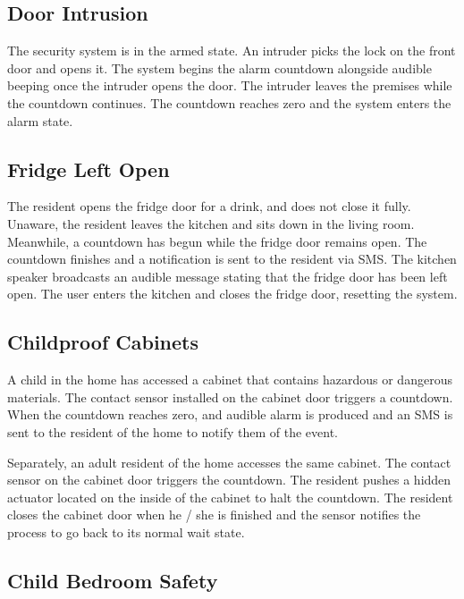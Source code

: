 \documentclass{report}
\begin{document}
\subsection*{Door Intrusion}

The security system is in the armed state. An intruder picks the lock on the
front door and opens it.  The system begins the alarm countdown alongside
audible beeping once the intruder opens the door.  The intruder leaves the
premises while the countdown continues. The countdown reaches zero and the
system enters the alarm state.

\subsection*{Fridge Left Open}

The resident opens the fridge door for a drink, and does not close it fully.
Unaware, the resident leaves the kitchen and sits down in the living room.
Meanwhile, a countdown has begun while the fridge door remains open. The
countdown finishes and a notification is sent to the resident via SMS. The
kitchen speaker broadcasts an audible message stating that the fridge door has
been left open. The user enters the kitchen and closes the fridge door,
resetting the system. 

\subsection*{Childproof Cabinets}

A child in the home has accessed a cabinet that contains hazardous or dangerous
materials. The contact sensor installed on the cabinet door triggers a
countdown. When the countdown reaches zero, and audible alarm is produced and
an SMS is sent to the resident of the home to notify them of the event.

Separately, an adult resident of the home accesses the same cabinet. The
contact sensor on the cabinet door triggers the countdown. The resident pushes
a hidden actuator located on the inside of the cabinet to halt the countdown.
The resident closes the cabinet door when he / she is finished and the sensor
notifies the process to go back to its normal wait state.

\subsection*{Child Bedroom Safety}
\end{document}

